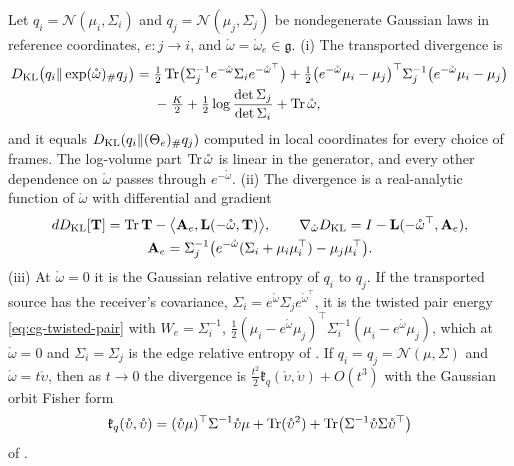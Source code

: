 Let \(q_i=\mathcal N(\mu_i,\Sigma_i)\) and \(q_j=\mathcal N(\mu_j,\Sigma_j)\) be nondegenerate
Gaussian laws in reference coordinates, \(e:j\to i\), and \(\mathring\omega=\mathring\omega_e\in\mathfrak g\).
(i) The transported divergence is
\begin{equation}
\begin{aligned}
D_{\mathrm{KL}}\bigl(q_i\Vert\exp(\mathring\omega)_\#q_j\bigr)
={}&\tfrac12\operatorname{Tr}\bigl(\Sigma_j^{-1}e^{-\mathring\omega}\Sigma_ie^{-\mathring\omega^\top}\bigr)
+\tfrac12\bigl(e^{-\mathring\omega}\mu_i-\mu_j\bigr)^\top\Sigma_j^{-1}\bigl(e^{-\mathring\omega}\mu_i-\mu_j\bigr)\\
&-\tfrac K2+\tfrac12\log\frac{\det\Sigma_j}{\det\Sigma_i}+\operatorname{Tr}\mathring\omega ,
\end{aligned}
\label{eq:glink-law-level-energy}
\end{equation}
and it equals \(D_{\mathrm{KL}}(q_i\Vert(\Theta_e)_\#q_j)\) computed in local coordinates for every choice of
frames. The log-volume part \(\operatorname{Tr}\mathring\omega\) is linear in the generator, and every other
dependence on \(\mathring\omega\) passes through \(e^{-\mathring\omega}\).
(ii) The divergence is a real-analytic function of \(\mathring\omega\) with differential and gradient
\begin{equation}
\begin{gathered}
dD_{\mathrm{KL}}[\mathbf T]=\operatorname{Tr}\mathbf T-\bigl\langle\mathbf A_e,\mathbf L(-\mathring\omega,\mathbf T)\bigr\rangle,
\qquad
\nabla_{\mathring\omega}D_{\mathrm{KL}}=I-\mathbf L(-\mathring\omega^\top,\mathbf A_e),\\
\mathbf A_e=\Sigma_j^{-1}\bigl(e^{-\mathring\omega}(\Sigma_i+\mu_i\mu_i^\top)-\mu_j\mu_i^\top\bigr).
\end{gathered}
\label{eq:glink-law-level-gradient}
\end{equation}
(iii) At \(\mathring\omega=0\) it is the Gaussian relative entropy of \(q_i\) to \(q_j\). If the
transported source has the receiver's covariance, \(\Sigma_i=e^{\mathring\omega}\Sigma_je^{\mathring\omega^\top}\),
it is the twisted pair energy \eqref{eq:cg-twisted-pair} with \(W_e=\Sigma_i^{-1}\),
\(\tfrac12(\mu_i-e^{\mathring\omega}\mu_j)^\top\Sigma_i^{-1}(\mu_i-e^{\mathring\omega}\mu_j)\), which
at \(\mathring\omega=0\) and \(\Sigma_i=\Sigma_j\) is the edge relative entropy of
. If \(q_i=q_j=\mathcal N(\mu,\Sigma)\) and
\(\mathring\omega=t\mathring\upsilon\), then as \(t\to0\) the divergence is
\(\tfrac{t^2}2\mathfrak k_q(\mathring\upsilon,\mathring\upsilon)+O(t^3)\) with the Gaussian orbit
Fisher form
\begin{equation}
\mathfrak k_q(\mathring\upsilon,\mathring\upsilon)
=(\mathring\upsilon\mu)^\top\Sigma^{-1}\mathring\upsilon\mu
+\operatorname{Tr}(\mathring\upsilon^2)+\operatorname{Tr}\bigl(\Sigma^{-1}\mathring\upsilon\Sigma\mathring\upsilon^\top\bigr)
\label{eq:glink-orbit-fisher}
\end{equation}
of . 

